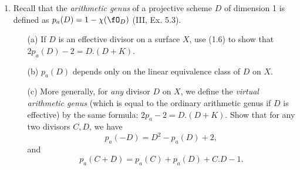 \documentclass[a4paper]{article}
\begin{document}
\begin{enumerate} [label=\textbf{\arabic*.}, leftmargin=0em]
          \begin{proof}
              By the Riemann-Roch theorem, we have the equality
              \begin{equation*}
                  P(z) = \frac{1}{2}H^2z^2 - \frac{1}{2}(H.K)z + 1 + p_a.
              \end{equation*}
              Matching coefficients readily gives $a, b$, and $c$.
              We can rewrite the coefficient of $z$ as
              \begin{equation*}
                  -\frac{1}{2}(H.K) = \frac{1}{2}H^2 - \frac{1}{2} H.(H + K),
              \end{equation*}
              and the adjunction formula (1.5) gives
              \begin{equation*}
                  2\pi - 2 = H.(H + K).
              \end{equation*}
              We conclude that
              \begin{equation*}
                  b = \frac{1}{2}H^2 + 1 - \pi.
              \end{equation*}
              If $C$ is any curve in $X$, then the degree of $C$ in $\P^N$ is just the degree of $\fO_X(H) \otimes \fO_C$ as a line bundle on $C$, which is equal to $C.H$ by (1.3).
          \end{proof}

    \item Recall that the \textit{arithmetic genus} of a projective scheme $D$ of dimension 1 is defined as $p_a(D) = 1 - \chi(\fO_D)$ (III, Ex. 5.3).
          \begin{itemize}
              \item[(a)] If $D$ is an effective divisor on a surface $X$, use (1.6) to show that $2p_a(D) - 2 = D.(D + K)$.
              \item[(b)] $p_a(D)$ depends only on the linear equivalence class of $D$ on $X$.
              \item[(c)] More generally, for \textit{any} divisor $D$ on $X$, we define the \textit{virtual arithmetic genus} (which is equal to the ordinary arithmetic genus if $D$ is effective) by the same formula: $2p_a - 2 = D.(D + K)$.
                    Show that for any two divisors $C, D$, we have
                    \begin{equation*}
                        p_a(-D) = D^2 - p_a(D) + 2,
                    \end{equation*}
                    and $$p_a(C + D) = p_a(C) + p_a(D) + C.D - 1.$$
          \end{itemize}


\end{enumerate}
\end{document}
